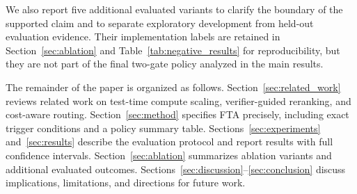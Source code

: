 We also report five additional evaluated variants to clarify the boundary of the
supported claim and to separate exploratory development from held-out evaluation
evidence.
Their implementation labels are retained in Section~\ref{sec:ablation} and
Table~\ref{tab:negative_results} for reproducibility, but they are not part of
the final two-gate policy analyzed in the main results.

The remainder of the paper is organized as follows.
Section~\ref{sec:related_work} reviews related work on test-time compute scaling,
verifier-guided reranking, and cost-aware routing.
Section~\ref{sec:method} specifies FTA precisely, including exact trigger
conditions and a policy summary table.
Sections~\ref{sec:experiments} and~\ref{sec:results} describe the evaluation
protocol and report results with full confidence intervals.
Section~\ref{sec:ablation} summarizes ablation variants and additional evaluated outcomes.
Sections~\ref{sec:discussion}--\ref{sec:conclusion} discuss implications,
limitations, and directions for future work.

